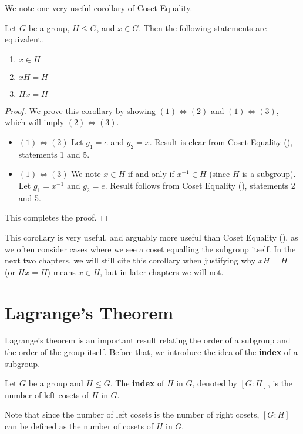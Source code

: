 We note one very useful corollary of Coset Equality.
\begin{corollary}\label{corollary-equivalence-of-element-in-coset}
    Let $G$ be a group, $H \leq G$, and $x \in G$. Then the following statements are equivalent.
    \begin{enumerate}[label=(\arabic*)]
        \item $x \in H$
        \item $xH = H$
        \item $Hx = H$
    \end{enumerate}
\end{corollary}
\begin{proof}
    We prove this corollary by showing $(1) \iff (2)$ and $(1) \iff (3)$, which will imply $(2) \iff (3)$.
    \begin{itemize}
        \item $\boxed{(1) \iff (2)}$ Let $g_1 = e$ and $g_2 = x$. Result is clear from Coset Equality (), statements 1 and 5.
        \item $\boxed{(1) \iff (3)}$ We note $x \in H$ if and only if $x^{-1} \in H$ (since $H$ is a subgroup). Let $g_1 = x^{-1}$ and $g_2 = e$. Result follows from Coset Equality (), statements 2 and 5.
    \end{itemize}
    This completes the proof.
\end{proof}
\begin{remark}
    This corollary is very useful, and arguably more useful than Coset Equality (), as we often consider cases where we see a coset equalling the subgroup itself. In the next two chapters, we will still cite this corollary when justifying why $xH = H$ (or $Hx = H$) means $x \in H$, but in later chapters we will not.
\end{remark}

\newpage

\section{Lagrange's Theorem}
Lagrange's theorem is an important result relating the order of a subgroup and the order of the group itself. Before that, we introduce the idea of the \textbf{index} of a subgroup.
\begin{definition}
    Let $G$ be a group and $H \leq G$. The \textbf{index} of $H$ in $G$, denoted by $[G : H]$, is the number of left cosets of $H$ in $G$.
\end{definition}
Note that since the number of left cosets is the number of right cosets, $[G : H]$ can be defined as the number of cosets of $H$ in $G$.

